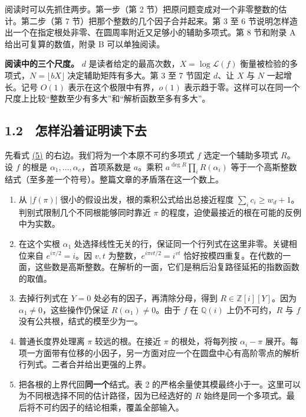 \documentclass[11pt,a4paper]{article}
\providecommand{\tightlist}{\setlength{\itemsep}{0pt}\setlength{\parskip}{0pt}}
\begin{document}
阅读时可以先抓住两步。第一步（第 2 节）把原问题变成对一个非零整数的估计。第二步（第 7 节）把那个整数的几个因子合并起来。第 3 至 6 节说明怎样造出一个在指定根处非零、在圆周率附近又足够小的辅助多项式。第 8 节和附录 A 给出可复算的数值，附录 B 可以单独阅读。

\textbf{阅读中的三个尺度。} \(d\) 是读者给定的最高次数，\(X=\log\mathcal L(f)\) 衡量被检验的多项式，\(N=\lfloor bX\rfloor\) 决定辅助矩阵有多大。第 3 至 7 节固定 \(d\)、让 \(X\) 与 \(N\) 一起增长。记号 \(O(1)\) 表示在这个极限中有界，\(o(1)\) 表示趋于零。这样可以在同一个尺度上比较``整数至少有多大''和``解析函数至多有多大''。

\subsection{1.2　怎样沿着证明读下去}\label{ux600eux6837ux6cbfux7740ux8bc1ux660eux8bfbux4e0bux53bb}

先看式 \hyperref[eq:5]{(5)} 的右边。我们将为一个本原不可约多项式 \(f\) 选定一个辅助多项式 \(R\)。设 \(f\) 的根是 \(\alpha_1,\ldots,\alpha_e\)，首项系数是 \(a\)。乘积 \(a^{\deg R}\prod_iR(\alpha_i)\) 等于一个高斯整数结式（至多差一个符号）。整篇文章的矛盾落在这一个数上。

\begin{enumerate}
\def\labelenumi{\arabic{enumi}.}
\tightlist
\item
  从 \(|f(\pi)|\) 很小的假设出发，根的乘积公式给出总接近程度 \(\sum_i c_i\ge w_d+1\)。判别式限制几个不同根能够同时靠近 \(\pi\) 的程度，迫使最接近的根在可能的反例中为实数。
\item
  在这个实根 \(\alpha_1\) 处选择线性无关的行，保证同一个行列式在这里非零。关键相位来自 \(e^{i\pi/2}=i\)。因 \(v,t\) 为整数，\(e^{i\pi vt/2}=i^{vt}\) 恰好按模四重复。在代数的一面，这些数是高斯整数。在解析的一面，它们是稍后沿复路径延拓的指数函数的取值。
\item
  去掉行列式在 \(Y=0\) 处必有的因子，再清除分母，得到 \(R\in\mathbb Z[i][Y]\)。因为 \(\alpha_1\ne0\)，这些操作仍保证 \(R(\alpha_1)\ne0\)。由于 \(f\) 在 \(\mathbb Q(i)\) 上仍不可约，\(R\) 与 \(f\) 没有公共根，结式的模至少为一。
\item
  普通长度界处理离 \(\pi\) 较远的根。在接近 \(\pi\) 的根处，将每列按 \(\alpha_i-\pi\) 展开。每项一方面带有位移的小因子，另一方面对应一个在圆盘中心有高阶零点的解析行列式。二者合并给出更强的上界。
\item
  把各根的上界代回\textbf{同一个}结式。表 2 的严格余量使其模最终小于一。这里可以为不同根选择不同的估计路径，因为已经选好的 \(R\) 始终是同一个多项式。最后将不可约因子的结论相乘，覆盖全部输入。
\end{enumerate}
\end{document}
